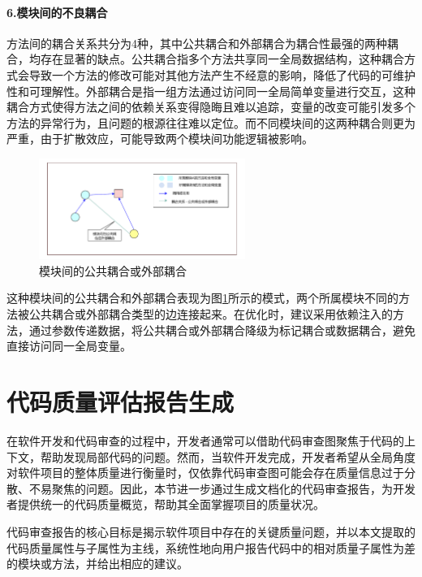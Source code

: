 \paragraph{6.模块间的不良耦合} 方法间的耦合关系共分为4种，其中公共耦合和外部耦合为耦合性最强的两种耦合，均存在显著的缺点。公共耦合指多个方法共享同一全局数据结构，这种耦合方式会导致一个方法的修改可能对其他方法产生不经意的影响，降低了代码的可维护性和可理解性。外部耦合是指一组方法通过访问同一全局简单变量进行交互，这种耦合方式使得方法之间的依赖关系变得隐晦且难以追踪，变量的改变可能引发多个方法的异常行为，且问题的根源往往难以定位。而不同模块间的这两种耦合则更为严重，由于扩散效应，可能导致两个模块间功能逻辑被影响。


\begin{figure}[h]
\centering
\includegraphics[width = 0.6\textwidth]{figures/模块间公共耦合.pdf}
\caption{模块间的公共耦合或外部耦合}
\label{1_模块间的公共耦合或外部耦合}
\end{figure}

这种模块间的公共耦合和外部耦合表现为图\ref{1_模块间的公共耦合或外部耦合}所示的模式，两个所属模块不同的方法被公共耦合或外部耦合类型的边连接起来。在优化时，建议采用依赖注入的方法，通过参数传递数据，将公共耦合或外部耦合降级为标记耦合或数据耦合，避免直接访问同一全局变量。



\section{代码质量评估报告生成}

在软件开发和代码审查的过程中，开发者通常可以借助代码审查图聚焦于代码的上下文，帮助发现局部代码的问题。然而，当软件开发完成，开发者希望从全局角度对软件项目的整体质量进行衡量时，仅依靠代码审查图可能会存在质量信息过于分散、不易聚焦的问题。因此，本节进一步通过生成文档化的代码审查报告，为开发者提供统一的代码质量概览，帮助其全面掌握项目的质量状况。

代码审查报告的核心目标是揭示软件项目中存在的关键质量问题，并以本文提取的代码质量属性与子属性为主线，系统性地向用户报告代码中的相对质量子属性为差的模块或方法，并给出相应的建议。

